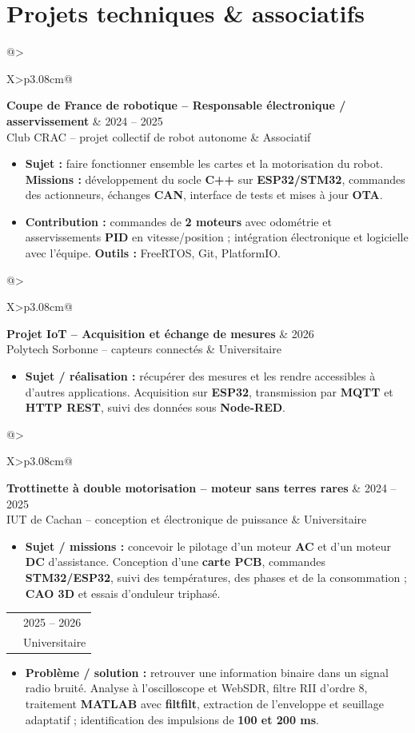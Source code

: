 \documentclass[9pt,a4paper]{extarticle}
\makeatletter
\newcommand{\entry}[4]{%
\begin{tabularx}{\linewidth}{@{}>{\raggedright\arraybackslash}X>{\raggedleft\arraybackslash}p{3.08cm}@{}}
 {\bfseries\color{bleu}#1} & {\fontsize{8.5}{9.3}\selectfont\color{secondaire}#2} \\[-2pt]
 {\fontsize{8.5}{9.6}\selectfont\color{secondaire}#3} & {\fontsize{8.5}{9.3}\selectfont\color{secondaire}#4}
\end{tabularx}\vspace{-3.4pt}\par}
\newcommand{\gapentry}{\vspace{3.1pt}}
\makeatother
\begin{document}
{\section{Projets techniques \& associatifs}
\entry{Coupe de France de robotique -- Responsable électronique / asservissement}{2024 -- 2025}{Club CRAC -- projet collectif de robot autonome}{Associatif}
\begin{itemize}
  \item \textbf{Sujet :} faire fonctionner ensemble les cartes et la motorisation du robot. \textbf{Missions :} développement du socle \textbf{C++} sur \textbf{ESP32/STM32}, commandes des actionneurs, échanges \textbf{CAN}, interface de tests et mises à jour \textbf{OTA}.
  \item \textbf{Contribution :} commandes de \textbf{2 moteurs} avec odométrie et asservissements \textbf{PID} en vitesse/position ; intégration électronique et logicielle avec l'équipe. \textbf{Outils :} FreeRTOS, Git, PlatformIO.
\end{itemize}
\gapentry
\entry{Projet IoT -- Acquisition et échange de mesures}{2026}{Polytech Sorbonne -- capteurs connectés}{Universitaire}
\begin{itemize}
  \item \textbf{Sujet / réalisation :} récupérer des mesures et les rendre accessibles à d'autres applications. Acquisition sur \textbf{ESP32}, transmission par \textbf{MQTT} et \textbf{HTTP REST}, suivi des données sous \textbf{Node-RED}.
\end{itemize}
\gapentry
\entry{Trottinette à double motorisation -- moteur sans terres rares}{2024 -- 2025}{IUT de Cachan -- conception et électronique de puissance}{Universitaire}
\begin{itemize}
  \item \textbf{Sujet / missions :} concevoir le pilotage d'un moteur \textbf{AC} et d'un moteur \textbf{DC} d'assistance. Conception d'une \textbf{carte PCB}, commandes \textbf{STM32/ESP32}, suivi des températures, des phases et de la consommation ; \textbf{CAO 3D} et essais d'onduleur triphasé.
\end{itemize}
\gapentry
\entry{Traitement du signal -- Réception et décodage DCF77}{2025 -- 2026}{Polytech Sorbonne -- signal radio bruité à 77,5 kHz}{Universitaire}
\begin{itemize}
  \item \textbf{Problème / solution :} retrouver une information binaire dans un signal radio bruité. Analyse à l'oscilloscope et WebSDR, filtre RII d'ordre 8, traitement \textbf{MATLAB} avec \textbf{filtfilt}, extraction de l'enveloppe et seuillage adaptatif ; identification des impulsions de \textbf{100 et 200 ms}.
\end{itemize}

}
\end{document}
